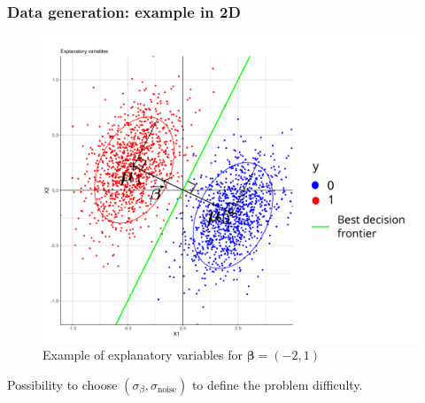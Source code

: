 \documentclass{beamer}
\begin{document}
\begin{frame}
    \frametitle{Data generation: example in 2D}

    \begin{figure}
        \centering
        \includegraphics[scale = 0.2]{images/2D_better.png}
        \caption{Example of explanatory variables for $\bm{\beta} = (-2,1)$}
    \end{figure}
    Possibility to choose $(\sigma_\beta,\sigma_{\text{noise}})$ to define the problem difficulty.
\end{frame}
\end{document}
